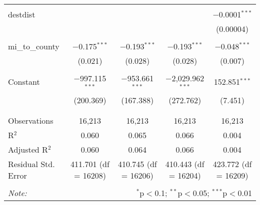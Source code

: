 \begin{table}[!htbp]
\begin{tabular}{@{\extracolsep{5pt}}lcccc}
  & & & & \\ 
 destdist &  &  &  & $-$0.0001$^{***}$ \\ 
  &  &  &  & (0.00004) \\ 
  & & & & \\ 
 mi\_to\_county & $-$0.175$^{***}$ & $-$0.193$^{***}$ & $-$0.193$^{***}$ & $-$0.048$^{***}$ \\ 
  & (0.021) & (0.028) & (0.028) & (0.007) \\ 
  & & & & \\ 
 Constant & $-$997.115$^{***}$ & $-$953.661$^{***}$ & $-$2,029.962$^{***}$ & 152.851$^{***}$ \\ 
  & (200.369) & (167.388) & (272.762) & (7.451) \\ 
  & & & & \\ 
\hline \\[-1.8ex] 
Observations & 16,213 & 16,213 & 16,213 & 16,213 \\ 
R$^{2}$ & 0.060 & 0.065 & 0.066 & 0.004 \\ 
Adjusted R$^{2}$ & 0.060 & 0.064 & 0.066 & 0.004 \\ 
Residual Std. Error & 411.701 (df = 16208) & 410.745 (df = 16206) & 410.443 (df = 16204) & 423.772 (df = 16209) \\ 
\hline 
\hline \\[-1.8ex] 
\textit{Note:}  & \multicolumn{4}{r}{$^{*}$p$<$0.1; $^{**}$p$<$0.05; $^{***}$p$<$0.01} \\ 
\end{tabular} 
\end{table} 
